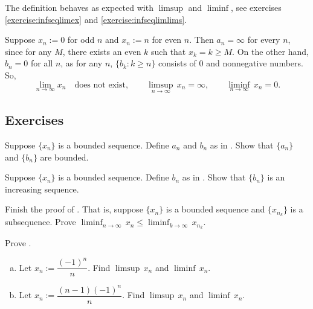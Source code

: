 The definition behaves as expected with
$\limsup$ and $\liminf$, see exercises \ref{exercise:infseqlimex}
and \ref{exercise:infseqlimlims}.

\begin{example}
Suppose 
$x_n := 0$ for odd $n$ and $x_n := n$ for even $n$.
Then $a_n = \infty$ for every $n$, since for any $M$,
there exists an even $k$ such that $x_k = k \geq M$.
On the other hand, $b_n = 0$ for all $n$, as
for any $n$,
$\{ b_k : k \geq n \}$ consists of $0$ and nonnegative numbers.
So,
\begin{equation*}
\lim_{n\to \infty} x_n \quad \text{does not exist},
\qquad 
\limsup_{n\to \infty} \, x_n = \infty ,
\qquad 
\liminf_{n\to \infty} \, x_n = 0.
\end{equation*}
\end{example}

\subsection{Exercises}

\begin{exercise}
Suppose $\{ x_n \}$ is a bounded sequence.  Define $a_n$ and
$b_n$ as in .  Show that $\{ a_n \}$
and $\{ b_n \}$ are bounded.
\end{exercise}

\begin{exercise}
Suppose $\{ x_n \}$ is a bounded sequence.
Define $b_n$ as in .  Show that
$\{ b_n \}$ is an increasing sequence.
\end{exercise}

\begin{exercise}
Finish the proof of .  That is,
suppose $\{ x_n \}$ is a bounded sequence and
$\{ x_{n_k} \}$ is a subsequence.  Prove
$\displaystyle \liminf_{n\to\infty}\, x_n \leq
\liminf_{k\to\infty}\, x_{n_k}$.
\end{exercise}

\begin{exercise}
Prove .
\end{exercise}

\begin{exercise}
\leavevmode
\begin{enumerate}[a)]
\item
Let $x_n := \dfrac{{(-1)}^n}{n}$.
Find $\limsup \, x_n$ and $\liminf \, x_n$.
\item
Let $x_n := \dfrac{(n-1){(-1)}^n}{n}$.
Find $\limsup \, x_n$ and $\liminf \, x_n$.
\end{enumerate}
\end{exercise}


